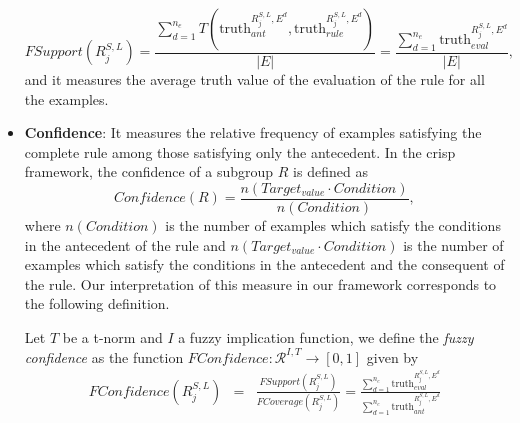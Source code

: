 \begin{itemize}
\begin{definition}
		$$FSupport(R^{S,L}_j) = \frac{\displaystyle \sum_{d=1}^{n_e} T(\text{truth}_{ant}^{R^{S,L}_j,E^d},\text{truth}_{rule}^{R^{S,L}_j,E^d})}{|E|} =\frac{\displaystyle \sum_{d=1}^{n_e} \text{truth}_{eval}^{R^{S,L}_j,E^d}}{|E|},$$
		and it measures the average truth value of the evaluation of the rule for all the examples.
	\end{definition}
	\item \textbf{Confidence}: It measures the relative frequency of examples satisfying the complete rule among those satisfying only the antecedent. In the crisp framework, the confidence of a subgroup $R$ is defined as
	$$Confidence(R) = \frac{n(Target_{value} \cdot Condition)}{n(Condition)},$$
	where $n(Condition)$ is the number of examples which satisfy the conditions in the antecedent of the rule and $n(Target_{value} \cdot Condition)$ is the number of examples which satisfy the conditions in the antecedent and the consequent of the rule. Our interpretation of this measure in our framework corresponds to the following definition.
	\begin{definition}
		Let $T$ be a t-norm and $I$ a fuzzy implication function, we define the \emph{fuzzy confidence} as the function $FConfidence : \mathcal{R}^{I,T} \to [0,1]$ given by 
		\begin{eqnarray*}
			FConfidence(R^{S,L}_j) &=& \frac{FSupport(R^{S,L}_j)}{FCoverage(R^{S,L}_j)} =  \frac{\displaystyle \sum_{d=1}^{n_e} \text{truth}_{eval}^{R^{S,L}_j,E^d}}{\displaystyle \sum_{d=1}^{n_e} \text{truth}_{ant}^{R^{S,L}_j,E^d}}  \\

\end{eqnarray*}
\end{definition}
\end{itemize}
